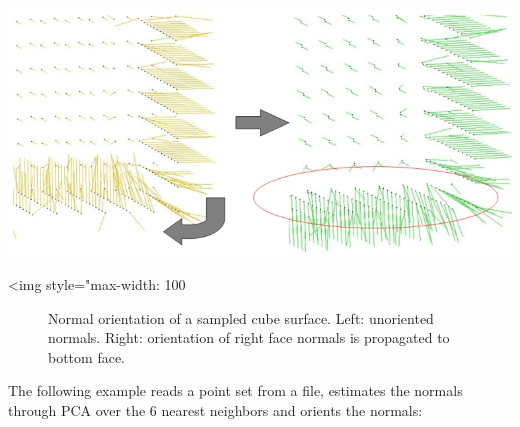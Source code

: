 \begin{center}
    \begin{ccTexOnly}
        \includegraphics[width=1.0\textwidth]{Point_set_processing_3/mst_orient_normals} %
    \end{ccTexOnly}
    \begin{ccHtmlOnly}
        <img style="max-width: 100%
    \end{ccHtmlOnly}
    \begin{figure}[h]
        \caption{Normal orientation of a sampled cube surface.
                 Left: unoriented normals.
                 Right: orientation of right face normals is propagated to bottom face.}
        \label{Point_set_processing_3-fig-mst_orient_normals}
    \end{figure}
\end{center}

\ccExample

The following example reads a point set from a file, estimates the normals through PCA over the 6 nearest neighbors and orients the normals:


